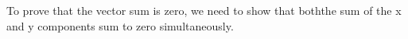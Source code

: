 \documentclass[preview]{standalone}
\begin{document}
\begin{center}
To prove that the vector sum is zero, we need to show that boththe sum of the x and y components sum to zero simultaneously.
\end{center}
\end{document}
